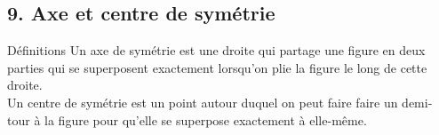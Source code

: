 %

\providecommand{\croix}[1]{\draw[line width=0.5pt] (#1) ++(-0.1,-0.1) -- ++(0.2,0.2) (#1) ++(-0.1,0.1) -- ++(0.2,-0.2);}
\providecommand{\tA}{node[midway, sloped, inner sep=0pt]{\tiny$\mid$}}
\providecommand{\tB}{node[midway, sloped, inner sep=0pt]{\tiny$\mid\mid$}}
\providecommand{\fl}{node[pos=0.72, sloped, inner sep=0pt]{\tiny$>$}}
\providecommand{\puceT}[1]{\hangindent=1em\hangafter=1\noindent\textbullet\,#1\par}
\providecommand{\sqm}[4]{\draw[line width=0.4pt] ({#1+#3*0.18},{#2}) -- ({#1+#3*0.18},{#2+#4*0.18}) -- ({#1},{#2+#4*0.18});}

\subsection*{9. Axe et centre de symétrie}

\begin{regle}{Définitions}
Un \textcolor{themeColor}{axe de symétrie} est une droite qui partage une figure en deux parties qui se superposent exactement lorsqu'on plie la figure le long de cette droite.\\[2pt]
Un \textcolor{themeColor}{centre de symétrie} est un point autour duquel on peut faire faire un demi-tour à la figure pour qu'elle se superpose exactement à elle-même.
\end{regle}

\vspace{6pt}
\begin{center}
\end{center}

